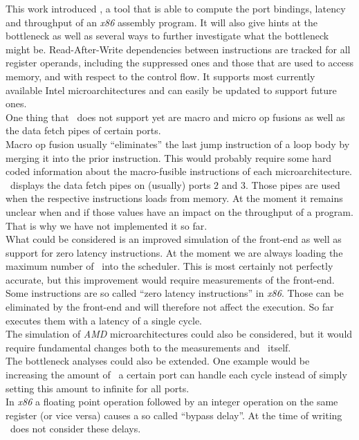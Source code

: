 This work introduced \suaca, a tool that is able to compute the port bindings, latency and throughput of an \emph{x86} assembly program. It will also give hints at the bottleneck as well as several ways to further investigate what the bottleneck might be. Read-After-Write dependencies between instructions are tracked for all register operands, including the suppressed ones and those that are used to access memory, and with respect to the control flow. It supports most currently available Intel microarchitectures and can easily be updated to support future ones.\\

One thing that \suaca\ does not support yet are macro and micro op fusions as well as the data fetch pipes of certain ports.\\
Macro op fusion usually ``eliminates'' the last jump instruction of a loop body by merging it into the prior instruction. This would probably require some hard coded information about the macro-fusible instructions of each microarchitecture.\\
\iaca\ displays the data fetch pipes on (usually) ports $2$ and $3$. Those pipes are used when the respective instructions loads from memory. At the moment it remains unclear when and if those values have an impact on the throughput of a program. That is why we have not implemented it so far.\\
What could be considered is an improved simulation of the front-end as well as support for zero latency instructions. At the moment we are always loading the maximum number of \microops\ into the scheduler. This is most certainly not perfectly accurate, but this improvement would require measurements of the front-end. Some instructions are so called ``zero latency instructions'' in \emph{x86}. Those can be eliminated by the front-end and will therefore not affect the execution. So far \suaca executes them with a latency of a single cycle.\\
The simulation of \emph{AMD} microarchitectures could also be considered, but it would require fundamental changes both to the measurements and \suaca\ itself.\\
The bottleneck analyses could also be extended. One example would be increasing the amount of \microops\ a certain port can handle each cycle instead of simply setting this amount to infinite for all ports.\\
In \emph{x86} a floating point operation followed by an integer operation on the same register (or vice versa) causes a so called ``bypass delay''. At the time of writing \suaca\ does not consider these delays.\\

